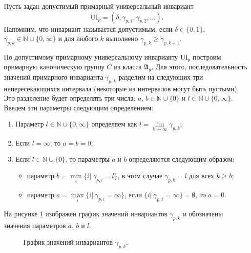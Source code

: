 \documentclass[a4paper,11pt,twoside]{article}
\def\A{{\mathfrak{A}}}
\def\N{{\mathbb{N}}}
\def\ui{{\mathrm{UI}}}
\begin{document}
Пусть задан допустимый примарный универсальный инвариант 
$$\ui_p = (\delta, \gamma_{p,1}, \gamma_{p,2}, \ldots).$$
Напомним, что инвариант называется допустимым, если $\delta \in \{0,1\}$, $\gamma_{p,k} \in \N \cup \{0, \infty\}$ и для любого $k$ выполнено $\gamma_{p,k} \geq \gamma_{p, k+1}$.

По допустимому примарному универсальному инварианту $\ui_p$ построим примарную каноническую группу $C$ из класса $\A_p$. Для этого, последовательность значений примарного инварианта $\gamma_{p,k}$ разделим на следующих три непересекающихся интервала (некоторые из интервалов могут быть пустыми). Это разделение будет определять три числа: $a$, $b \in \N \cup \{0\}$ и $l \in \N \cup \{0, \infty\}$. Введем эти параметры следующим определением:
\begin{enumerate}
\item Параметр $l \in \N \cup \{0, \infty\}$ определяем как $l = \lim\limits_{k \rightarrow \infty} \gamma_{p,k}$;
\item Если $l = \infty$, то $a = b = 0$;
\item Если $l \in \N \cup \{0\}$, то параметры $a$ и $b$ определяются следующим образом:
\begin{itemize}
\item параметр $b = \min\limits_{i} \{ i | \ \gamma_{p,i} = l\}$, в этом случае $\gamma_{p,k} = l$ для всех $k \geq b$;
\item параметр $a = \max\limits_{i} \{i | \ \gamma_{p,i} = \infty\}$, если $\{i | \ \gamma_{p,i} = \infty\} = \emptyset$, то $a = 0$.
\end{itemize}
\end{enumerate}

На рисунке \ref{pic:GammaPK} изображен график значений инвариантов $\gamma_{p,k}$ и обозначены значения параметров $a$, $b$ и $l$.

\begin{figure}[h!]
\centering
{}
\caption{График значений инвариантов $\gamma_{p,k}.$}\label{pic:GammaPK}
\end{figure}
\end{document}
